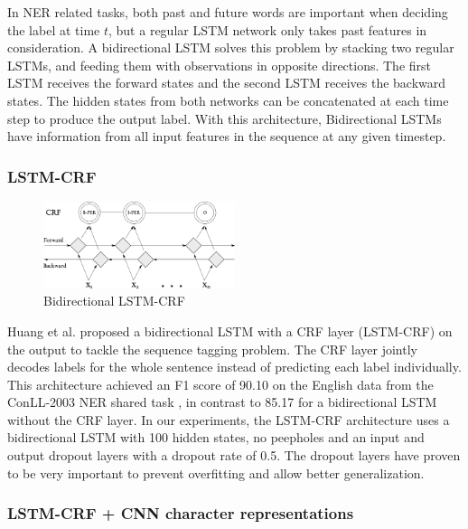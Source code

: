 \documentclass[sigconf]{acmart}
\begin{document}
In NER related tasks, both past and future words are important when deciding the
label at time $ t $, but a regular LSTM network only takes past features in consideration. 
A bidirectional LSTM solves this problem by stacking two regular LSTMs, and feeding
them with observations in opposite directions. The first LSTM receives the forward
states and the second LSTM receives the backward states. The hidden states from both 
networks can be concatenated at each time step to produce the output label. With this 
architecture, Bidirectional LSTMs have information from all input features in the sequence at 
any given timestep.

\subsubsection{LSTM-CRF}
\label{sssec:lstm_crf}

\begin{figure}
  \centering
  \includegraphics[width=0.5\textwidth]{pics/bi_lstm_crf}
  \caption{Bidirectional LSTM-CRF}
  \label{fig:bi_lstm_crf}
\end{figure}

Huang et al. \cite{Huang2015} proposed a bidirectional LSTM with a CRF layer (LSTM-CRF) on the output to tackle
the sequence tagging problem. The CRF layer jointly decodes labels for the whole sentence instead
of predicting each label individually. This architecture achieved an F1 score of 90.10 on the English
data from the ConLL-2003 NER shared task \cite{Sang2003}, in contrast to 85.17 for a bidirectional LSTM without the CRF layer. 
In our experiments, the LSTM-CRF architecture uses a bidirectional LSTM with 100 
hidden states, no peepholes and an input and output dropout layers with a dropout
rate of 0.5. The dropout layers have proven to be very important to prevent overfitting 
and allow better generalization.

\subsubsection{LSTM-CRF + CNN character representations}
\label{sssec:lstm_crf_cnn}
\end{document}
